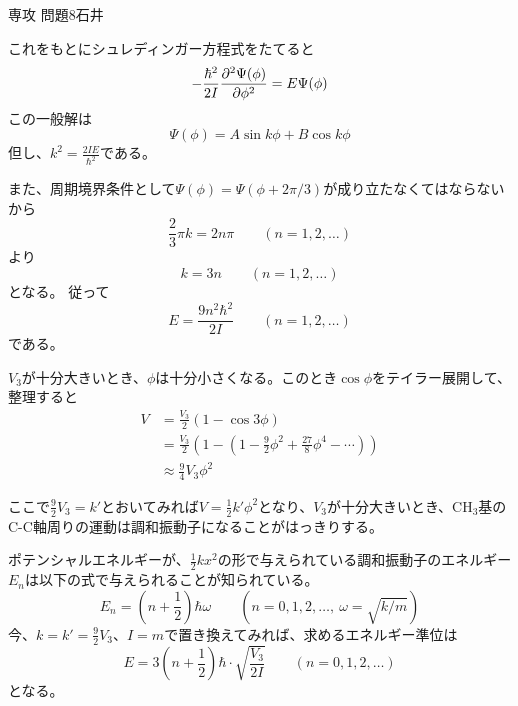 \documentclass[fleqn]{jbook}
\begin{document}
\begin{answer}{専攻 問題8}{石井}
\begin{subanswers}
\begin{subsubanswers}
これをもとにシュレディンガー方程式をたてると
\[
-\frac{\hbar ^{2}}{2I}\frac{\partial ^{2} \Psi (\phi)}{\partial \phi ^{2}} = E \Psi( \phi)
\]
この一般解は
\[  \Psi (\phi) = A \sin k \phi + B \cos k \phi  \]
但し、$ k^{2}=\frac{2IE}{\hbar^{2}}$である。

また、周期境界条件として$\Psi (\phi) = \Psi(\phi + 2 \pi/3)$が成り立たなくてはならないから
\[  \frac{2}{3} \pi k = 2n \pi \qquad (n=1,2, \ldots ) \]
より
\[
k= 3n \qquad (n=1,2, \ldots)
\]
となる。
従って
\[ E = \frac{9n^{2}\hbar^{2}}{2I} \qquad (n=1,2, \ldots )  \]
である。

\SubSubAnswer
$V_{3}$が十分大きいとき、$\phi$は十分小さくなる。このとき$\cos \phi$をテイラー展開して、整理すると
\begin{align*}
 V &= \frac{V_{3}}{2}(1 - \cos 3 \phi)  \\
   &= \frac{V_{3}}{2} \left( 1-\left(1-\frac{9}{2}\phi^{2} +\frac{27}{8}\phi^{4} - \cdots \right) \right) \\
   &\approx \frac{9}{4}V_{3}\phi^{2}
\end{align*}

ここで$\frac{9}{2}V_{3}= k'$とおいてみれば$V= \frac{1}{2}k' \phi^{2}$となり、$V_{3}$が十分大きいとき、CH$_{3}$基のC-C軸周りの運動は調和振動子になることがはっきりする。

ポテンシャルエネルギーが、$\frac{1}{2}kx^2$の形で与えられている調和振動子のエネルギー$E_n$は以下の式で与えられることが知られている。
\[  E_n = \left(n+\frac{1}{2}\right) \hbar \omega \qquad \left(n=0,1,2, \ldots ,\ \omega = \sqrt{k/m}\right) \]
今、$k = k' = \frac{9}{2}V_{3}$、$I=m$で置き換えてみれば、求めるエネルギー準位は
\[  E=3\left(n+ \frac{1}{2}\right)\hbar \cdot \sqrt{\frac{V_{3}}{2I}} \qquad (n=0,1,2, \ldots ) \]
となる。


\end{subsubanswers}
\end{subanswers}
\end{answer}
\end{document}
